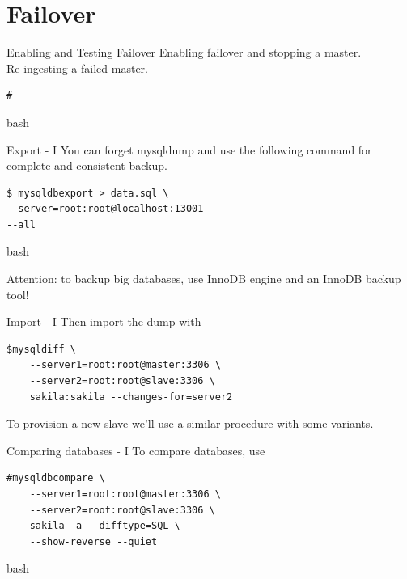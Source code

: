 \documentclass{beamer}[10]
\begin{document}
\section{Failover}
\begin{pyframe}{Enabling and Testing Failover}
Enabling failover and stopping a master. \\

Re-ingesting a failed master. \\

\begin{verbatim}
#
\end{verbatim}{bash}
\end{pyframe}

%
%
\begin{pyframe}{Export - I}
You can forget mysqldump and use the following
command for complete and consistent backup.
\begin{verbatim}
$ mysqldbexport > data.sql \
--server=root:root@localhost:13001
--all
\end{verbatim}{bash}

Attention: to backup big databases, use InnoDB engine
and an InnoDB backup tool!
\end{pyframe}


\begin{pyframe}{Import - I}
Then import the dump with
\begin{verbatim}
$mysqldiff \
    --server1=root:root@master:3306 \
    --server2=root:root@slave:3306 \
    sakila:sakila --changes-for=server2
\end{verbatim}
To provision a new slave we'll use a similar
procedure with some variants.
\end{pyframe}






%
%
\begin{pyframe}{Comparing databases - I}
To compare databases, use
\begin{verbatim}
#mysqldbcompare \
    --server1=root:root@master:3306 \
    --server2=root:root@slave:3306 \
    sakila -a --difftype=SQL \
    --show-reverse --quiet
\end{verbatim}{bash}
\end{pyframe}
\end{document}
